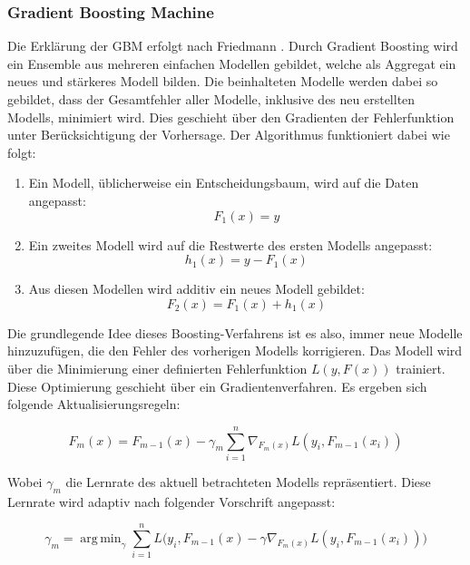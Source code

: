 \documentclass[
ngerman          %
,a4paper          %
,11pt
,pdftex
]{report}
\DeclareMathOperator*{\argmin}{arg\,min}
\begin{document}
\subsubsection*{Gradient Boosting Machine}
Die Erklärung der \ac{GBM} erfolgt nach Friedmann \cite{gbm}. Durch Gradient Boosting wird ein Ensemble aus mehreren einfachen Modellen gebildet, welche als Aggregat ein neues und stärkeres Modell bilden. Die beinhalteten Modelle werden dabei so gebildet, dass der Gesamtfehler aller Modelle, inklusive des neu erstellten Modells, minimiert wird. Dies geschieht über den Gradienten der Fehlerfunktion unter Berücksichtigung der Vorhersage. Der Algorithmus funktioniert dabei wie folgt:

\begin{enumerate}
\item Ein Modell, üblicherweise ein Entscheidungsbaum, wird auf die Daten angepasst: 
\begin{equation*}
F_1(x) = y
\end{equation*}
\item Ein zweites Modell wird auf die Restwerte des ersten Modells angepasst:
\begin{equation*}
h_1(x) = y - F_1(x)
\end{equation*}
\item Aus diesen Modellen wird additiv ein neues Modell gebildet:
\begin{equation*}
F_2(x) = F_1(x) + h_1(x)
\end{equation*}
\end{enumerate}

Die grundlegende Idee dieses Boosting-Verfahrens ist es also, immer neue Modelle hinzuzufügen, die den Fehler des vorherigen Modells korrigieren. Das Modell wird über die Minimierung einer definierten Fehlerfunktion $L(y, F(x))$ trainiert. Diese Optimierung geschieht über ein Gradientenverfahren. Es ergeben sich folgende Aktualisierungsregeln:

\begin{equation*}
F_m(x) = F_{m-1}(x) - \gamma_m \sum_{i=1}^{n} \nabla_{F_m(x)} L(y_i, F_{m-1}(x_i))
\end{equation*}

Wobei $\gamma_m$ die Lernrate des aktuell betrachteten Modells repräsentiert. Diese Lernrate wird adaptiv nach folgender Vorschrift angepasst:

\begin{equation*}
\gamma_m = \argmin_\gamma \sum_{i=1}^{n} L\bigl(y_i, F_{m-1}(x) - \gamma \nabla_{F_m(x)} L(y_i, F_{m-1}(x_i))\bigr)
\end{equation*}
\end{document}
